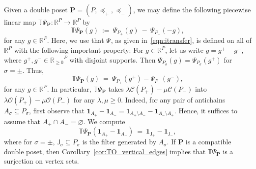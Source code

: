 \documentclass[11pt]{amsart}
\theoremstyle{definition}
\begin{document}
Given a double poset ${\mathbf{P}} = ({P},\preceq_+,\preceq_-)$, we may define the
following piecewise linear map ${{\mathbb{T}}{\Psi}_{\mathbf{P}}} : {\mathbb{R}}^{P} \rightarrow {\mathbb{R}}^{P}$ by
\begin{equation}\label{eqn:TPsi}
    {{\mathbb{T}}{\Psi}_{\mathbf{P}}}(g) \ := \ {\Psi}_{{P}_+}(g) \ - \ {\Psi}_{{P}_-}(-g),
\end{equation}
for any $g \in {\mathbb{R}}^{P}$. Here, we use that ${\Psi}_{}$, as given 
in~\eqref{eqn:itransfer}, is defined on all of ${\mathbb{R}}^{P}$ with
the following important property: For $g \in {\mathbb{R}}^{P}$, let us write
$g = g^+ - g^-$, where $g^+,g^- \in {{\mathbb{R}}_{\ge0}}^{P}$ with disjoint
supports. Then ${\Psi}_{{P}_\sigma}(g) = {\Psi}_{{P}_\sigma}(g^+)$
for $\sigma = \pm$. Thus, 
\[
    {{\mathbb{T}}{\Psi}_{\mathbf{P}}}(g) \ = \ {\Psi}_{{P}_+}(g^+) - {\Psi}_{{P}_-}(g^-),
\]
for any $g \in {\mathbb{R}}^{P}$.  In particular, ${{\mathbb{T}}{\Psi}_{\mathbf{P}}}$ takes $\lambda
{\mathcal{C}({{{P}_+}})} - \mu {\mathcal{C}({{{P}_-}})}$ into $\lambda {\mathcal{O}({{P}_+})} - \mu {\mathcal{O}({{P}_-})}$
for any $\lambda,\mu \ge 0$.  Indeed, for any pair of antichains $A_\sigma
\subseteq {P}_\sigma$, first observe that ${\mathbf{1}}_{A_+} - {\mathbf{1}}_{A_-} =
{\mathbf{1}}_{A_+\setminus A_-} - {\mathbf{1}}_{A_-\setminus A_+}$. Hence, it suffices to assume
that $A_+ \cap A_- = {\varnothing}$. We compute
\[
    {{\mathbb{T}}{\Psi}_{\mathbf{P}}}({\mathbf{1}}_{A_+} - {\mathbf{1}}_{A_-} ) \ = \ {\mathbf{1}}_{{\mathsf{J}}_+} -
    {\mathbf{1}}_{{\mathsf{J}}_-},
\]
where for $\sigma = \pm$, ${\mathsf{J}}_\sigma \subseteq {P}_\sigma$ is the filter generated by
$A_\sigma$. If ${\mathbf{P}}$ is a compatible double poset, then
Corollary~\ref{cor:TO_vertical_edges} implies that ${{\mathbb{T}}{\Psi}_{\mathbf{P}}}$ is a
surjection on vertex sets. 
\end{document}

